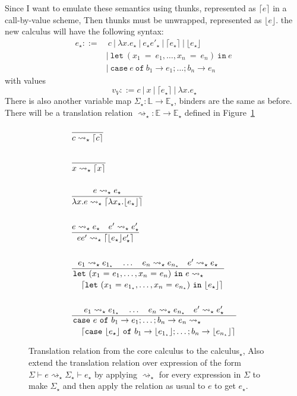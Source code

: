\documentclass[float=false, crop=false]{standalone}
\numberwithin{subcase}{case}
\newcommand{\tlang}{\star}
\newcommand{\thunk}[1]{\lceil #1 \rceil}
\newcommand{\unwrap}[1]{\lfloor #1 \rfloor}
\newcommand{\tlthunk}{\rightsquigarrow_\tlang}
\begin{document}
Since I want to emulate these semantics using thunks, represented as $\thunk{e}$ in a call-by-value scheme, 
Then thunks must be unwrapped, represented as $\unwrap{e}$. 
the new calculus will have the following syntax:
\begin{align*} 
  e_\tlang ::=&\ c\ |\ \lambda x.e_\tlang\ |\ e_\tlang e'_\tlang\ |\ \thunk{e_\tlang}\ |\ \unwrap{e_\tlang}
  \\ &|\ \mathtt{let}\ (x_1\ \mathtt{=}\ e_1,\dotsc, x_n\ \mathtt{=}\ e_n)\ \mathtt{in}\ e\
  \\ &|\ \mathtt{case}\ e\ \mathtt{of}\ b_1 \rightarrow e_1; \dots; b_n \rightarrow e_n
\end{align*}
with values 
\[ v_V ::= c\ |\ x\ |\ \thunk{e_\tlang}\ |\ \lambda x. e_\tlang \]
There is also another variable map $\Sigma_\tlang : \mathbb{L} \rightarrow \mathbb{E}_\tlang$, 
binders are the same as before.
There will be a translation relation $\tlthunk: \mathbb{E} \rightarrow \mathbb{E}_\tlang$
defined in Figure~\ref{t:translation}

\begin{figure}
\begin{align*}
  &\frac{}{c \tlthunk \thunk{c}}\\ \\
  &\frac{}{x \tlthunk \thunk{x}}\\ \\
  &\frac{e \tlthunk e_\tlang}
     {\lambda x . e \tlthunk \thunk{\lambda x_\tlang.\unwrap{e_\tlang}}}\\ \\
  &\frac{e  \tlthunk e_\tlang \quad e' \tlthunk e'_\tlang}
  {e e' \tlthunk \thunk{\unwrap{e_\tlang} e'_\tlang}}\\ \\
  &\dfrac{e_1  \tlthunk e_{1_\tlang} \quad \dots \quad e_n \tlthunk e_{n_\tlang} \quad e' \tlthunk e_\tlang}
  {\splitdfrac{\mathtt{let}\ (x_1\ \mathtt{=}\ e_1,\dotsc, x_n\ \mathtt{=}\ e_n)\ \mathtt{in}\ e \tlthunk}
    {\thunk{\mathtt{let}\ 
        (x_1\ \mathtt{=}\ e_{1_\tlang},\dotsc, x_n\ \mathtt{=}\ e_{n_\tlang}) \ \mathtt{in}\ \unwrap{e_\tlang}}}}\\ \\
  &\dfrac{e_1  \tlthunk e_{1_\tlang} \quad \dots \quad e_n \tlthunk e_{n_\tlang} \quad e' \tlthunk e'_\tlang}
  {\splitdfrac{\mathtt{case}\ e\ \mathtt{of}\ b_1 \rightarrow e_1; \dots; b_n \rightarrow e_n \tlthunk}
  {\thunk{\mathtt{case}\ \unwrap{e_\tlang}\ \mathtt{of}\ b_1 \rightarrow \unwrap{e_{1_\tlang}}; 
      \dots; b_n \rightarrow \unwrap{e_{n_\tlang}}}}}
\end{align*}
\caption[Definition of translation relation from the core calculus to  calculus$_\tlang$]{Translation relation from the core calculus to the calculus$_\tlang$, Also
extend the translation relation over expression of the form $\Sigma \vdash e \tlthunk \Sigma_\tlang 
\vdash e_\tlang$ by applying $\tlthunk$ for every expression in $\Sigma$ to make $\Sigma_\tlang$ and
then apply the relation as usual to $e$ to get $e_\tlang$.}
\label{t:translation}
\end{figure}
\end{document}
